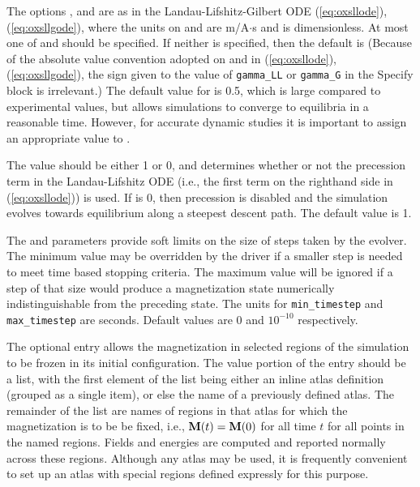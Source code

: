 \begin{description}
The options ,  and
 are as in the Landau-Lifshitz-Gilbert ODE
(\ref{eq:oxsllode}), (\ref{eq:oxsllgode}), where the units on
\abovemath{\bar{\gamma}} and \abovemath{\gamma} are m/A$\cdot$s and
\abovemath{\alpha} is dimensionless.  At most one of
\abovemath{\bar{\gamma}} and \abovemath{\gamma} should be specified.  If
neither is specified, then the default is
%
(Because of the absolute value convention adopted on
\abovemath{\bar{\gamma}} and \abovemath{\gamma} in
(\ref{eq:oxsllode}), (\ref{eq:oxsllgode}), the sign given to the value of
\texttt{gamma\_LL} or \texttt{gamma\_G} in the Specify block is
irrelevant.)  The default value for \abovemath{\alpha} is 0.5, which is
large compared to experimental values, but allows simulations to
converge to equilibria in a reasonable time.  However, for accurate
dynamic studies it is important to assign an appropriate value to
\abovemath{\alpha}.

The  value should be either 1 or 0, and determines
whether or not the precession term in the Landau-Lifshitz ODE (i.e., the
first term on the righthand side in (\ref{eq:oxsllode})) is used.  If
 is 0, then precession is disabled and the simulation
evolves towards equilibrium along a steepest descent path.  The default
value is 1.

The  and  parameters provide
soft limits on the size of steps taken by the evolver.  The minimum
value may be overridden by the driver if a smaller step is needed to
meet time based stopping criteria.  The maximum value will be ignored if
a step of that size would produce a magnetization state numerically
indistinguishable from the preceding state.  The units for
\texttt{min\_timestep} and \texttt{max\_timestep} are seconds.  Default
values are 0 and $10^{-10}$ respectively.

The optional  entry allows the magnetization in
selected regions of the simulation to be frozen in its initial
configuration.  The value portion of the entry should be a list, with
the first element of the list being either an inline atlas definition
(grouped as a single item), or else the name of a previously defined
atlas.  The remainder of the list are names of regions in that atlas for
which the magnetization is to be be fixed, i.e., $\textbf{M}(t)=\textbf{M}(0)$ for all
time $t$ for all points in the named regions.  Fields and energies are
computed and reported normally across these regions.  Although any atlas
may be used, it is frequently convenient to set up an atlas with special
regions defined expressly for this purpose.


\end{description}

